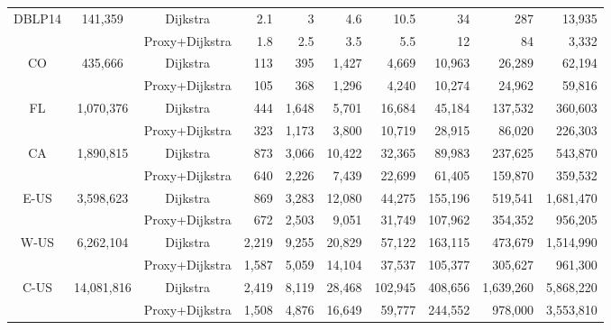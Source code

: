 \begin{table}[t!]
\begin{center}
\begin{tabular}{|c|c|c||r|r|r|r|r|r|r|}
 \multirow{2}{*}{DBLP14}&  \multirow{2}{*}{141,359} & Dijkstra & 2.1          & 3   & 4.6 & 10.5 & 34 & 287 & 13,935 \\ \cline{3-10}
                       & & Proxy+Dijkstra & {1.8} & {2.5} & {3.5} & {5.5} & {12} & {84} & {3,332} \\ \hline \hline
 \multirow{2}{*}{CO}&  \multirow{2}{*}{435,666}     & Dijkstra & 113 & 395 & 1,427 & 4,669 & 10,963 & 26,289 & 62,194 \\ \cline{3-10}
                      &  & Proxy+Dijkstra & {105} & {368} & {1,296} & {4,240} & {10,274} & {24,962} & {59,816} \\ \hline
 \multirow{2}{*}{FL}  &  \multirow{2}{*}{1,070,376}   & Dijkstra & 444 & 1,648 & 5,701 & 16,684 & 45,184 & 137,532 & 360,603 \\ \cline{3-10}
                    &   & Proxy+Dijkstra & {323} & {1,173} & {3,800} & {10,719} & {28,915} & {86,020}  & {226,303} \\ \hline
 \multirow{2}{*}{CA} &  \multirow{2}{*}{1,890,815}   & Dijkstra & 873 & 3,066 & 10,422 & 32,365 & 89,983 & 237,625 & 543,870 \\ \cline{3-10}
                      &  & Proxy+Dijkstra & {640} & {2,226} & {7,439}  & {22,699} & {61,405} & {159,870} & {359,532} \\ \hline
 \multirow{2}{*}{E-US}&  \multirow{2}{*}{3,598,623}   & Dijkstra & 869 & 3,283 & 12,080 & 44,275 & 155,196 & 519,541 & 1,681,470 \\ \cline{3-10}
                      &  & Proxy+Dijkstra & {672} & {2,503} & {9,051}  & {31,749} & {107,962} & {354,352} & {956,205} \\ \hline
 \multirow{2}{*}{W-US} & \multirow{2}{*}{6,262,104}   & Dijkstra & 2,219 & 9,255 & 20,829 & 57,122 & 163,115 & 473,679 & 1,514,990 \\ \cline{3-10}
                     &  & Proxy+Dijkstra & {1,587} & {5,059} & {14,104} & {37,537} & {105,377} & {305,627} & {961,300} \\ \hline
 \multirow{2}{*}{C-US}& \multirow{2}{*}{14,081,816}   & Dijkstra & 2,419 & 8,119 & 28,468 & 102,945 & 408,656 & 1,639,260 & 5,868,220 \\ \cline{3-10}
                      &  & Proxy+Dijkstra & {1,508} & {4,876} & {16,649} & {59,777} & {244,552} & {978,000} & {3,553,810} \\ \hline
\end{tabular}
\end{center}
\vspace{-2ex}
\end{table}


